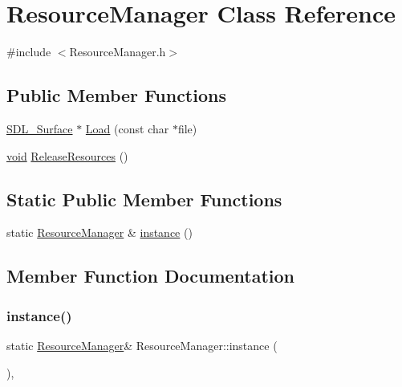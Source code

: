 \hypertarget{class_resource_manager}{}\section{Resource\+Manager Class Reference}
\label{class_resource_manager}


{\ttfamily \#include $<$Resource\+Manager.\+h$>$}

\subsection*{Public Member Functions}
\begin{DoxyCompactItemize}
\item 
\mbox{\hyperlink{struct_s_d_l___surface}{S\+D\+L\+\_\+\+Surface}} $\ast$ \mbox{\hyperlink{class_resource_manager_ae3e0dffeb8fb5abc33d1714ecf2e8c7f}{Load}} (const char $\ast$file)
\item 
\mbox{\hyperlink{_s_d_l__opengles2__gl2ext_8h_ae5d8fa23ad07c48bb609509eae494c95}{void}} \mbox{\hyperlink{class_resource_manager_a9f50b131ddf3670ea40a832b532f39dc}{Release\+Resources}} ()
\end{DoxyCompactItemize}
\subsection*{Static Public Member Functions}
\begin{DoxyCompactItemize}
\item 
static \mbox{\hyperlink{class_resource_manager}{Resource\+Manager}} \& \mbox{\hyperlink{class_resource_manager_a575597c974ab420c8ec99ba273a91079}{instance}} ()
\end{DoxyCompactItemize}


\subsection{Member Function Documentation}
\mbox{\label{class_resource_manager_a575597c974ab420c8ec99ba273a91079}} 
\subsubsection{\texorpdfstring{instance()}{instance()}}
{\footnotesize\ttfamily static \mbox{\hyperlink{class_resource_manager}{Resource\+Manager}}\& Resource\+Manager\+::instance (\begin{DoxyParamCaption}{ }\end{DoxyParamCaption})\hspace{0.3cm}{\ttfamily [inline]}, {\ttfamily [static]}}

